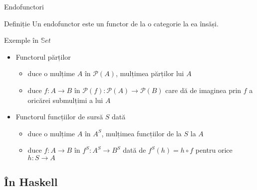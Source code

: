 \documentclass[xcolor=pdftex,romanian,colorlinks]{beamer}
\begin{document}
\begin{frame}{Endofunctori}
\begin{block}{Definiție}
Un endofunctor este un functor de la o categorie la ea însăși.
\end{block}

\begin{block}{Exemple în $\mathbb{S}et$}
\begin{itemize}
\item Functorul părților
\begin{itemize}
\item duce o mulțime $A$ în $\mathcal{P}(A)$, mulțimea părților lui $A$
\item duce $f : A \rightarrow B$ în $\mathcal{P}(f) : \mathcal{P}(A) \rightarrow \mathcal{P}(B)$ care dă de imaginea prin $f$ a oricărei submulțimi a lui $A$
\end{itemize}
\item Functorul funcțiilor de sursă $S$ dată 
\begin{itemize}
\item duce o mulțime $A$ în $A^S$, mulțimea funcțiilor de la $S$ la $A$
\item duce $f : A \rightarrow B$ în $f^S : A^S \rightarrow B^S$ dată de 
$f^S(h) = h \circ f$ pentru orice $h : S \rightarrow A$
\end{itemize}

\end{itemize}
\end{block}
\end{frame}

\subsection{În Haskell}
\end{document}
